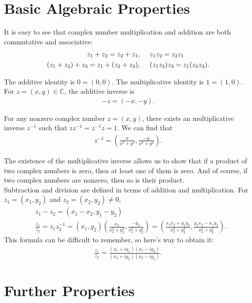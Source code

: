 \documentclass{book}
\theoremstyle{definition}
\newcommand{\f}[2]{\frac{#1}{#2}}
\newcommand{\C}{\mathbb{C}}
\newcommand{\lp}{\left(}
\newcommand{\rp}{\right)}
\begin{document}
\section{Basic Algebraic Properties}

It is easy to see that complex number multiplication and addition are both commutative and associative:
\begin{align}
z_1 + z_2 = z_2 + z_1, &\hspace{0.5cm} z_1z_2 = z_2z_1\\
(z_1 + z_2) + z_3 = z_1 + (z_2 + z_3), &\hspace{0.5cm} (z_1z_2)z_3 = z_1(z_2z_3). 
\end{align}

The additive identity is $0 = (0,0)$. The multiplicative identity is $1 = (1,0)$. For $z = (x,y)\in \C$, the additive inverse is 
\begin{align}
-z = (-x,-y).
\end{align}

For any nonzero complex number $z = (x,y)$, there exists an multiplicative inverse $z^{-1}$ such that $zz^{-1} = z^{-1}z = 1$. We can find that
\begin{align}
z^{-1} = \lp \frac{x}{x^2 + y^2}, \frac{-y}{x^2 + y^2} \rp.
\end{align}

The existence of the multiplicative inverse allows us to show that if a product of two complex numbers is zero, then at least one of them is zero. And of course, if two complex numbers are nonzero, then so is their product. \\

Subtraction and division are defined in terms of addition and multiplication. For $z_1 = (x_1,y_2)$ and $z_2 = (x_2,y_2) \neq 0$, 
\begin{align}
&z_1 - z_2 = (x_1 - x_2, y_1 - y_2)\\
&\frac{z_1}{z_2} = z_1z_2^{-1} = (x_1,y_2)   \lp \frac{x_2}{x_2^2 + y_2^2}, \frac{-y_2}{x_2^2 + y_2^2} \rp = \lp \frac{x_1x_2 + y_1y_2}{x_2^2 + y_2^2} , \frac{y_1x_2 - x_1y_2}{x_2^2 + y_2^2} \rp.
\end{align}
This formula can be difficult to remember, so here's way to obtain it:
\begin{align}
\f{z_1}{z_2} = \f{(x_1 + iy_1)(x_2 - iy_2)}{(x_2 + iy_2)(x_2 - iy_2)}.
\end{align}






\section{Further Properties}
\end{document}
